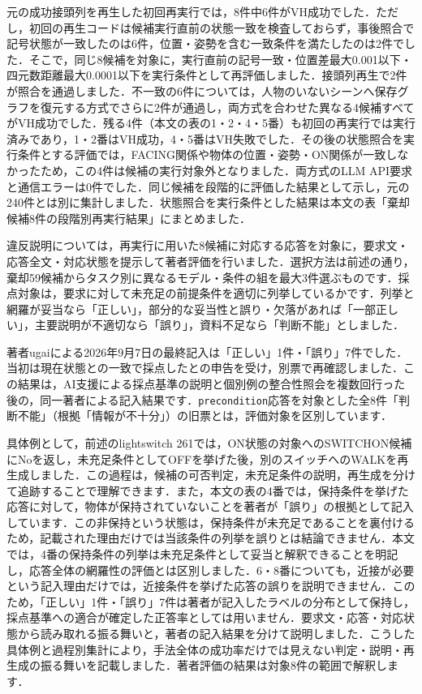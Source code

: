 \documentclass{jsarticle}
\begin{document}
元の成功接頭列を再生した初回再実行では，8件中6件がVH成功でした．ただし，初回の再生コードは候補実行直前の状態一致を検査しておらず，事後照合で記号状態が一致したのは6件，位置・姿勢を含む一致条件を満たしたのは2件でした．そこで，同じ8候補を対象に，実行直前の記号一致・位置差最大0.001以下・四元数距離最大0.0001以下を実行条件として再評価しました．接頭列再生で2件が照合を通過しました．不一致の6件については，人物のいないシーンへ保存グラフを復元する方式でさらに2件が通過し，両方式を合わせた異なる4候補すべてがVH成功でした．残る4件（本文の表の1・2・4・5番）も初回の再実行では実行済みであり，1・2番はVH成功，4・5番はVH失敗でした．その後の状態照合を実行条件とする評価では，FACING関係や物体の位置・姿勢・ON関係が一致しなかったため，この4件は候補の実行対象外となりました．両方式のLLM API要求と通信エラーは0件でした．同じ候補を段階的に評価した結果として示し，元の240件とは別に集計しました．状態照合を実行条件とした結果は本文の表「棄却候補8件の段階別再実行結果」にまとめました．

違反説明については，再実行に用いた8候補に対応する応答を対象に，要求文・応答全文・対応状態を提示して著者評価を行いました．選択方法は前述の通り，棄却59候補からタスク別に異なるモデル・条件の組を最大3件選ぶものです．採点対象は，要求に対して未充足の前提条件を適切に列挙しているかです．列挙と網羅が妥当なら「正しい」，部分的な妥当性と誤り・欠落があれば「一部正しい」，主要説明が不適切なら「誤り」，資料不足なら「判断不能」としました．

著者ugaiによる2026年9月7日の最終記入は「正しい」1件・「誤り」7件でした．当初は現在状態との一致で採点したとの申告を受け，別票で再確認しました．この結果は，AI支援による採点基準の説明と個別例の整合性照会を複数回行った後の，同一著者による記入結果です．\texttt{precondition}応答を対象とした全8件「判断不能」（根拠「情報が不十分」）の旧票とは，評価対象を区別しています．

具体例として，前述のlightswitch 261では，ON状態の対象へのSWITCHON候補にNoを返し，未充足条件としてOFFを挙げた後，別のスイッチへのWALKを再生成しました．この過程は，候補の可否判定，未充足条件の説明，再生成を分けて追跡することで理解できます．また，本文の表の4番では，保持条件を挙げた応答に対して，物体が保持されていないことを著者が「誤り」の根拠として記入しています．この非保持という状態は，保持条件が未充足であることを裏付けるため，記載された理由だけでは当該条件の列挙を誤りとは結論できません．本文では，4番の保持条件の列挙は未充足条件として妥当と解釈できることを明記し，応答全体の網羅性の評価とは区別しました．6・8番についても，近接が必要という記入理由だけでは，近接条件を挙げた応答の誤りを説明できません．このため，「正しい」1件・「誤り」7件は著者が記入したラベルの分布として保持し，採点基準への適合が確定した正答率としては用いません．要求文・応答・対応状態から読み取れる振る舞いと，著者の記入結果を分けて説明しました．こうした具体例と過程別集計により，手法全体の成功率だけでは見えない判定・説明・再生成の振る舞いを記載しました．著者評価の結果は対象8件の範囲で解釈します．
\end{document}
